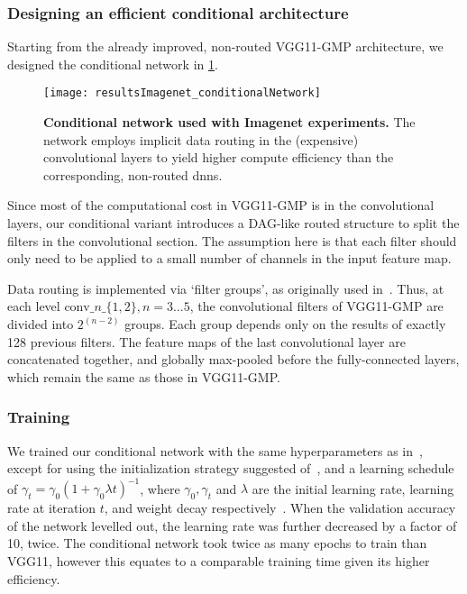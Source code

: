 \documentclass[thesis]{subfiles}
\begin{document}
	\subsubsection{Designing an efficient conditional architecture}
	Starting from the already improved, non-routed VGG11-GMP architecture, we designed the conditional network in \cref{fig:Imagenet_CondNet}.
	\begin{figure}[tbp]
		\centering
		\texttt{[image: resultsImagenet\_conditionalNetwork]}
		\caption[Conditional network used with ILSVRC experiments]{\textbf{Conditional network used with Imagenet experiments.} The network employs implicit data routing in the (expensive) convolutional layers to yield higher compute efficiency than the corresponding, non-routed \glspl{dnn}.}\label{fig:Imagenet_CondNet}
	\end{figure}
	Since most of the computational cost in VGG11-GMP is in the convolutional layers, our conditional variant 
	introduces a DAG-like routed structure to split the filters in the convolutional section.
	The assumption here is that each filter should only need to be applied to a small number of channels in the input feature map.
	
	Data routing is implemented via `filter groups', as originally used in~\citep{Krizhevsky2012}. 
	Thus, at each level $\textrm{conv}\_n\_\{1,2\}, n=3\ldots 5$, the convolutional filters of VGG11-GMP are 
	divided into $2^{(n-2)}$ groups. Each group depends only on the results of exactly 128 previous filters. 
	The feature maps of the last convolutional layer are concatenated together, and globally max-pooled
	before the fully-connected layers, which remain the same as those in VGG11-GMP.
	
	\subsubsection{Training}
	We trained our conditional network with the same hyperparameters as in~\citep{Simonyan2014verydeep}, 
	except for using the initialization strategy suggested of~\citep{He2015b}, and a learning schedule of 
	$\gamma_t = \gamma_0(1+\gamma_0\lambda t)^{-1}$, where $\gamma_0,\gamma_t$ and $\lambda$ 
	are the initial learning rate, learning rate at iteration $t$, and weight decay respectively~\citep{Bottou2012sgdtricks}. 
	When the validation accuracy of the network levelled out, the learning rate was further decreased by a factor of 10, twice. 
	The conditional network took twice as many epochs to train than VGG11, however this equates to a comparable
	training time given its higher efficiency.
\end{document}
